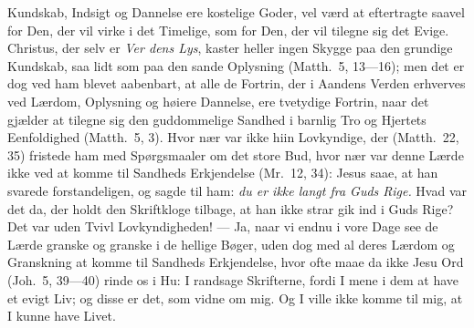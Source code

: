 \documentclass[12pt,a4paper]{book}
\begin{document}
Kundskab, Indsigt og Dannelse ere kostelige Goder, vel værd at eftertragte saavel for Den,
der vil virke i det Timelige, som for Den, der vil tilegne sig det Evige. Christus, der
selv er \emph{Ver\-%
dens Lys}, kaster heller ingen Skygge paa den grundige Kundskab, saa lidt som paa den
sande Oplysning (Matth.\ 5, 13---16); men det er dog ved ham blevet aabenbart, at alle de
Fortrin, der i Aandens Verden erhverves ved Lærdom, Oplysning og høiere Dannelse, ere
tvetydige Fortrin, naar det gjælder at tilegne sig den guddommelige Sandhed i barnlig Tro
og Hjertets Eenfoldighed (Matth.\ 5, 3). Hvor nær var ikke hiin Lovkyndige, der (Matth.\
22, 35) fristede ham med Spørgsmaaler om det store Bud, hvor nær var denne Lærde ikke ved
at komme til Sandheds Erkjendelse (Mr.\ 12, 34): Jesus saae, at han svarede forstandeligen,
og sagde til ham: \emph{du er ikke langt fra Guds Rige.} Hvad var det da, der holdt den
Skriftkloge tilbage, at han ikke strar gik ind i Guds Rige? Det var uden Tvivl
Lovkyndigheden! --- Ja, naar vi endnu i vore Dage see de Lærde granske og granske i de
hellige Bøger, uden dog med al deres Lærdom og Granskning at komme til Sandheds
Erkjendelse, hvor ofte maae da ikke Jesu Ord (Joh.\ 5, 39---40) rinde os i Hu: {\large I
randsage Skrifterne, fordi I mene i dem at have et evigt Liv; og disse er det, som vidne om
mig. Og I ville ikke komme til mig, at I kunne have Livet.}
\end{document}
